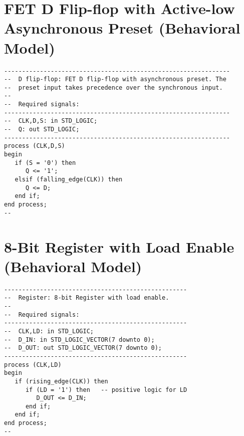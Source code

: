 \section{FET D Flip-flop with Active-low Asynchronous Preset (Behavioral Model)}
\noindent
\begin{minipage}{1\linewidth}
\begin{lstlisting}
---------------------------------------------------------------
--  D flip-flop: FET D flip-flop with asynchronous preset. The 
--  preset input takes precedence over the synchronous input.
--
--  Required signals: 
---------------------------------------------------------------
--  CLK,D,S: in STD_LOGIC;
--  Q: out STD_LOGIC;
---------------------------------------------------------------
process (CLK,D,S) 
begin
   if (S = '0') then 
      Q <= '1'; 
   elsif (falling_edge(CLK)) then  
      Q <= D;
   end if;
end process;
--
\end{lstlisting}
\end{minipage}

\section{8-Bit Register with Load Enable (Behavioral Model)}
\noindent
\begin{minipage}{1\linewidth}
\begin{lstlisting}
---------------------------------------------------
--  Register: 8-bit Register with load enable. 
--
--  Required signals: 
---------------------------------------------------
--  CLK,LD: in STD_LOGIC;
--  D_IN: in STD_LOGIC_VECTOR(7 downto 0);
--  D_OUT: out STD_LOGIC_VECTOR(7 downto 0);
---------------------------------------------------
process (CLK,LD) 
begin
   if (rising_edge(CLK)) then  
      if (LD = '1') then   -- positive logic for LD
         D_OUT <= D_IN;
      end if;
   end if;
end process;
--
\end{lstlisting}
\end{minipage}

